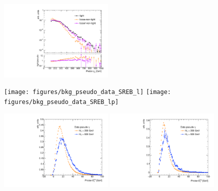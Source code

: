 \begin{figure}[h]
  \begin{center}
    \includegraphics[width=0.49\textwidth]{figures/bkg_data_pseudo_tight_data_VR}
  \label{fig:jetfake_pseudo_data_pt}
  \end{center}
\end{figure}

\begin{figure}[h]
  \begin{center}
    \texttt{[image: figures/bkg\_pseudo\_data\_SREB\_l]}
    \texttt{[image: figures/bkg\_pseudo\_data\_SREB\_lp]}
  \label{fig:jetfake_pseudo_data_BE}
  \end{center}
\end{figure}

\begin{figure}[h]
  \begin{center}
    \includegraphics[width=0.49\textwidth]{figures/bkg_pseudo_data_SR_VR_l}
    \includegraphics[width=0.49\textwidth]{figures/bkg_pseudo_data_SR_VR_lp}
  \label{fig:jetfake_pseudo_data_LR_VR}
  \end{center}
\end{figure}

